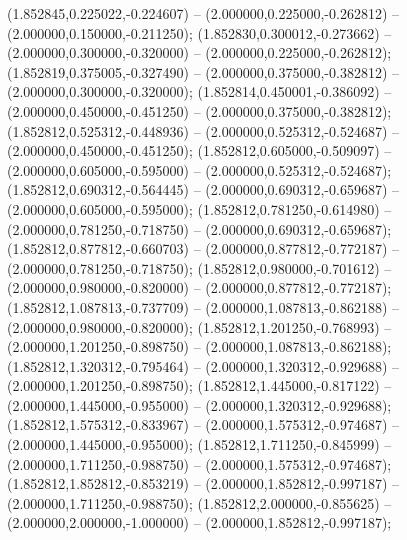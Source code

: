  (1.852845,0.225022,-0.224607) -- (2.000000,0.225000,-0.262812) -- (2.000000,0.150000,-0.211250);
 (1.852830,0.300012,-0.273662) -- (2.000000,0.300000,-0.320000) -- (2.000000,0.225000,-0.262812);
 (1.852819,0.375005,-0.327490) -- (2.000000,0.375000,-0.382812) -- (2.000000,0.300000,-0.320000);
 (1.852814,0.450001,-0.386092) -- (2.000000,0.450000,-0.451250) -- (2.000000,0.375000,-0.382812);
 (1.852812,0.525312,-0.448936) -- (2.000000,0.525312,-0.524687) -- (2.000000,0.450000,-0.451250);
 (1.852812,0.605000,-0.509097) -- (2.000000,0.605000,-0.595000) -- (2.000000,0.525312,-0.524687);
 (1.852812,0.690312,-0.564445) -- (2.000000,0.690312,-0.659687) -- (2.000000,0.605000,-0.595000);
 (1.852812,0.781250,-0.614980) -- (2.000000,0.781250,-0.718750) -- (2.000000,0.690312,-0.659687);
 (1.852812,0.877812,-0.660703) -- (2.000000,0.877812,-0.772187) -- (2.000000,0.781250,-0.718750);
 (1.852812,0.980000,-0.701612) -- (2.000000,0.980000,-0.820000) -- (2.000000,0.877812,-0.772187);
 (1.852812,1.087813,-0.737709) -- (2.000000,1.087813,-0.862188) -- (2.000000,0.980000,-0.820000);
 (1.852812,1.201250,-0.768993) -- (2.000000,1.201250,-0.898750) -- (2.000000,1.087813,-0.862188);
 (1.852812,1.320312,-0.795464) -- (2.000000,1.320312,-0.929688) -- (2.000000,1.201250,-0.898750);
 (1.852812,1.445000,-0.817122) -- (2.000000,1.445000,-0.955000) -- (2.000000,1.320312,-0.929688);
 (1.852812,1.575312,-0.833967) -- (2.000000,1.575312,-0.974687) -- (2.000000,1.445000,-0.955000);
 (1.852812,1.711250,-0.845999) -- (2.000000,1.711250,-0.988750) -- (2.000000,1.575312,-0.974687);
 (1.852812,1.852812,-0.853219) -- (2.000000,1.852812,-0.997187) -- (2.000000,1.711250,-0.988750);
 (1.852812,2.000000,-0.855625) -- (2.000000,2.000000,-1.000000) -- (2.000000,1.852812,-0.997187);
